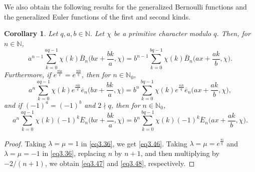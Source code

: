 \documentclass[reqno]{amsart}
\numberwithin{equation}{section}
\newtheorem{corollary}[thm]{Corollary}
\begin{document}
We also obtain the following results for the generalized Bernoulli functions and the generalized Euler functions of the first and second kinds.

\begin{corollary}\label{cor3.10} Let $q,a,b\in\mathbb{N}$. Let $\chi$ be a primitive character modulo $q$. Then, for $n\in\mathbb{N}$,
\begin{equation}\label{eq3.46}
a^{n-1}\sum_{k=0}^{aq-1}\chi(k)\overline{B}_{n}\biggl(bx+\frac{bk}{a},\chi\biggl)=b^{n-1}\sum_{k=0}^{bq-1}\chi(k)\overline{B}_{n}\biggl(ax+\frac{ak}{b},\chi\biggl).
\end{equation}
Furthermore, if $e^{\frac{\pi \mathrm{i}a}{q}}=e^{\frac{\pi \mathrm{i}b}{q}}$, then for $n\in\mathbb{N}_{0}$,
\begin{equation}\label{eq3.47}
a^{n}\sum_{k=0}^{aq-1}\chi(k)e^{\frac{\pi \mathrm{i}k}{q}}\overline{e}_{n}\biggl(bx+\frac{bk}{a},\chi\biggl)=b^{n}\sum_{k=0}^{bq-1}\chi(k)e^{\frac{\pi \mathrm{i}k}{q}}\overline{e}_{n}\biggl(ax+\frac{ak}{b},\chi\biggl),
\end{equation}
and if $(-1)^{a}=(-1)^{b}$ and $2\nmid q$, then for $n\in\mathbb{N}_{0}$,
\begin{equation}\label{eq3.48}
a^{n}\sum_{k=0}^{aq-1}\chi(k)(-1)^{k}\overline{E}_{n}\biggl(bx+\frac{bk}{a},\chi\biggl)=b^{n}\sum_{k=0}^{bq-1}\chi(k)(-1)^{k}\overline{E}_{n}\biggl(ax+\frac{ak}{b},\chi\biggl).
\end{equation}
\end{corollary}

\begin{proof}
Taking $\lambda=\mu=1$ in \eqref{eq3.36}, we get \eqref{eq3.46}. Taking $\lambda=\mu=e^{\frac{\pi\mathrm{i}}{q}}$ and $\lambda=\mu=-1$ in \eqref{eq3.36}, replacing $n$ by $n+1$, and then multiplying by
$-2/(n+1)$, we obtain \eqref{eq3.47} and \eqref{eq3.48}, respectively.
\end{proof}
\end{document}
